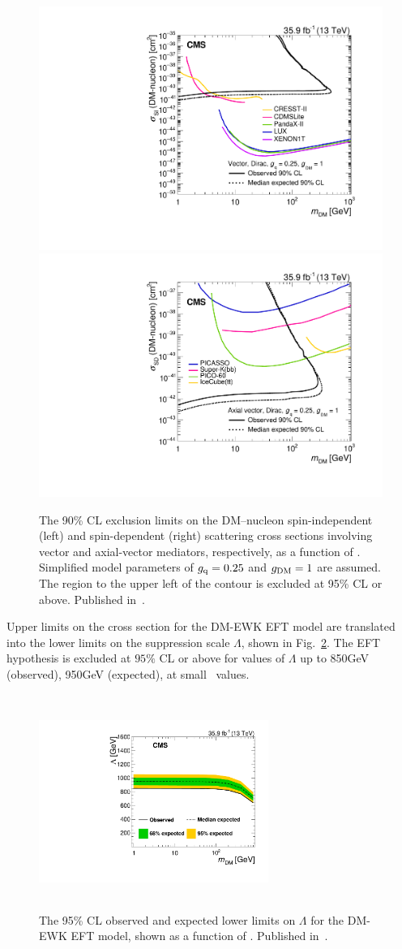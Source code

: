 \begin{figure}[htbp]
  \begin{center}
    \includegraphics[width=0.48\linewidth]{figures/exo16053/Figure_008-a.pdf}
    \includegraphics[width=0.48\linewidth]{figures/exo16053/Figure_008-b.pdf}
    \caption{
      The 90\% CL exclusion limits on the DM--nucleon spin-independent (left)
      and spin-dependent (right) scattering cross sections involving vector and axial-vector mediators, respectively,
      as a function of \mdm. Simplified model parameters of $g_\mathrm{q}=0.25$ and $g_\mathrm{DM}=1$ are assumed.
      The region to the upper left of the contour is excluded at 95\% CL or above. Published in~\cite{ref:JHEP02(2019)074}.
    }
    \label{fig:2d_mx}
  \end{center}
\end{figure}

Upper limits on the cross section for the DM-EWK EFT model are translated into the lower limits on the suppression scale $\Lambda$, shown in
Fig.~\ref{fig:DMEWKlimits}. The EFT hypothesis is excluded at $95\%$ CL or above for values of $\Lambda$ up to 850\unit{GeV} (observed), 950\unit{GeV}
(expected), at small \mdm\ values.

\begin{figure}[htbp]
\begin{center}
\includegraphics[width=7.5cm,height=7.0cm]{figures/exo16053/Figure_009.pdf}
\caption{The 95\% CL observed and expected lower limits on $\Lambda$ for the DM-EWK EFT model, shown as a function of \mdm.
Published in~\cite{ref:JHEP02(2019)074}.}
\label{fig:DMEWKlimits}
\end{center}
\end{figure}

